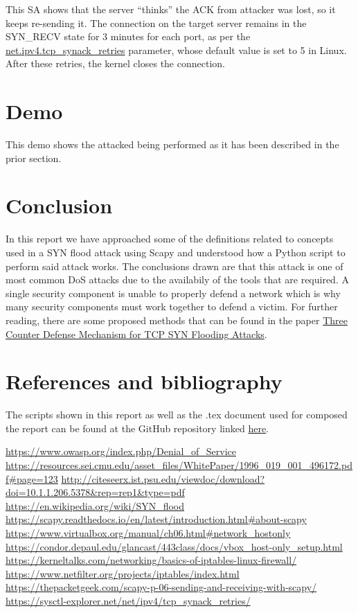 \documentclass[11pt]{article}
\begin{document}
This SA shows that the server “thinks” the ACK from attacker was lost, so it keeps re-sending it. The connection on the target server remains in the SYN\_RECV state for 3 minutes for each port, as per the \href{https://sysctl-explorer.net/net/ipv4/tcp\_synack\_retries/}{net.ipv4.tcp\_synack\_retries} parameter, whose default value is set to 5 in Linux. After these retries, the kernel closes the connection.\vspace{5mm}

\section{Demo}
This demo shows the attacked being performed as it has been described in the prior section.

\section{Conclusion}
In this report we have approached some of the definitions related to concepts used in a SYN flood attack using Scapy and understood how a Python script to perform said attack works. The conclusions drawn are that this attack is one of most common DoS attacks due to the availabily of the tools that are required. A single security component is unable to properly defend a network which is why many security components must work together to defend a victim. For further reading, there are some proposed methods that can be found in the paper \href{http://citeseerx.ist.psu.edu/viewdoc/download?doi=10.1.1.206.5378&rep=rep1&type=pdf}{Three Counter Defense Mechanism for TCP SYN Flooding Attacks}. 

\section{References and bibliography}

The scripts shown in this report as well as the .tex document used for composed the report can be found at the GitHub repository linked \href{https://github.com/beagaliana/syn-flooding-attack}{here}.\vspace{5mm}

\url{https://www.owasp.org/index.php/Denial\_of\_Service}\break
\url{https://resources.sei.cmu.edu/asset\_files/WhitePaper/1996\_019\_001\_496172.pdf#page=123}\break
\url{http://citeseerx.ist.psu.edu/viewdoc/download?doi=10.1.1.206.5378&rep=rep1&type=pdf}\break
\url{https://en.wikipedia.org/wiki/SYN\_flood}\break
\url{https://scapy.readthedocs.io/en/latest/introduction.html#about-scapy}\break
\url{https://www.virtualbox.org/manual/ch06.html#network\_hostonly}\break
\url{https://condor.depaul.edu/glancast/443class/docs/vbox\_host-only\_setup.html}\break
\url{https://kerneltalks.com/networking/basics-of-iptables-linux-firewall/}\break
\url{https://www.netfilter.org/projects/iptables/index.html}\break
\url{https://thepacketgeek.com/scapy-p-06-sending-and-receiving-with-scapy/}\break
\url{https://sysctl-explorer.net/net/ipv4/tcp\_synack\_retries/}\break

\printindex
\end{document}
